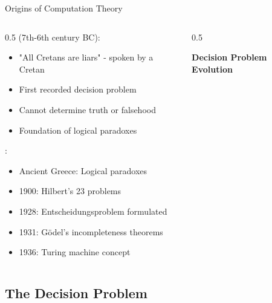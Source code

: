 \begin{frame}{Origins of Computation Theory}
\begin{columns}
\begin{column}{0.5\textwidth}
 (7th-6th century BC):
\begin{itemize}
\item "All Cretans are liars" - spoken by a Cretan
\item First recorded decision problem
\item Cannot determine truth or falsehood
\item Foundation of logical paradoxes
\end{itemize}

\vspace{0.3cm}
:
\begin{itemize}
\item Ancient Greece: Logical paradoxes
\item 1900: Hilbert's 23 problems
\item 1928: Entscheidungsproblem formulated
\item 1931: Gödel's incompleteness theorems
\item 1936: Turing machine concept
\end{itemize}
\end{column}
\begin{column}{0.5\textwidth}
\begin{center}
\textbf{Decision Problem Evolution}
\vspace{0.3cm}

\end{center}
\end{column}
\end{columns}
\end{frame}

\subsection{The Decision Problem}

